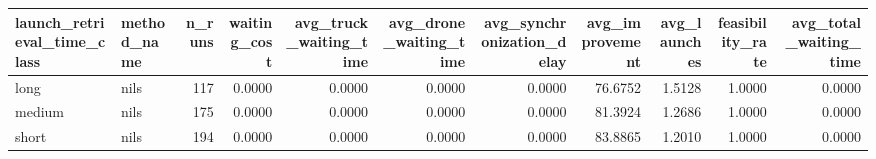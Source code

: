 \begin{tabular}{llrrrrrrrrr}
\toprule
launch_retrieval_time_class & method_name & n_runs & waiting_cost & avg_truck_waiting_time & avg_drone_waiting_time & avg_synchronization_delay & avg_improvement & avg_launches & feasibility_rate & avg_total_waiting_time \\
\midrule
long & nils & 117 & 0.0000 & 0.0000 & 0.0000 & 0.0000 & 76.6752 & 1.5128 & 1.0000 & 0.0000 \\
medium & nils & 175 & 0.0000 & 0.0000 & 0.0000 & 0.0000 & 81.3924 & 1.2686 & 1.0000 & 0.0000 \\
short & nils & 194 & 0.0000 & 0.0000 & 0.0000 & 0.0000 & 83.8865 & 1.2010 & 1.0000 & 0.0000 \\
\bottomrule
\end{tabular}
